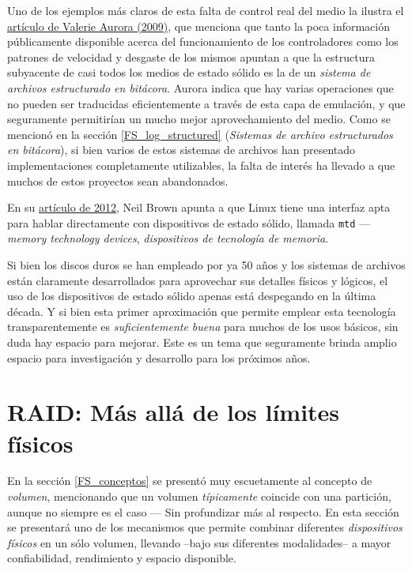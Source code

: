\documentclass[11pt,fleqn]{book} %
\begin{document}
Uno de los ejemplos más claros de esta falta de control real del medio
la ilustra el \href{https://lwn.net/Articles/353411/}{artículo de Valerie Aurora (2009)}, que menciona que
tanto la poca información públicamente disponible acerca del
funcionamiento de los controladores como los patrones de velocidad y
desgaste de los mismos apuntan a que la estructura subyacente de casi
todos los medios de estado sólido es la de un \emph{sistema de archivos estructurado en bitácora}. Aurora indica que hay varias operaciones
que no pueden ser traducidas eficientemente a través de esta capa de
emulación, y que seguramente permitirían un mucho mejor
aprovechamiento del medio. Como se mencionó en la sección
\ref{FS_log_structured} (\emph{Sistemas de archivo estructurados en bitácora}), si bien varios de estos sistemas de archivos han
presentado implementaciones completamente utilizables, la falta de
interés ha llevado a que muchos de estos proyectos sean abandonados.

En su \href{http://lwn.net/Articles/528617/}{artículo de 2012}, Neil Brown apunta a que Linux tiene una
interfaz apta para hablar directamente con dispositivos de estado
sólido, llamada \texttt{mtd} — \emph{memory technology devices}, \emph{dispositivos de tecnología de memoria}.

Si bien los discos duros se han empleado por ya 50 años y los sistemas
de archivos están claramente desarrollados para aprovechar sus
detalles físicos y lógicos, el uso de los dispositivos de estado
sólido apenas está despegando en la última década. Y si bien esta
primer aproximación que permite emplear esta tecnología
transparentemente es \emph{suficientemente buena} para muchos de los usos
básicos, sin duda hay espacio para mejorar. Este es un tema que
seguramente brinda amplio espacio para investigación y desarrollo para
los próximos años.
\section{RAID: Más allá de los límites físicos}
\label{sec-10-2}
\label{FS_FIS_RAID}

En la sección \ref{FS_conceptos} se presentó muy escuetamente al
concepto de \emph{volumen}, mencionando que un volumen \emph{típicamente}
coincide con una partición, aunque no siempre es el caso — Sin
profundizar más al respecto. En esta sección se presentará uno de los
mecanismos que permite combinar diferentes \emph{dispositivos físicos} en
un sólo volumen, llevando –bajo sus diferentes modalidades– a mayor
confiabilidad, rendimiento y espacio disponible.
\end{document}
